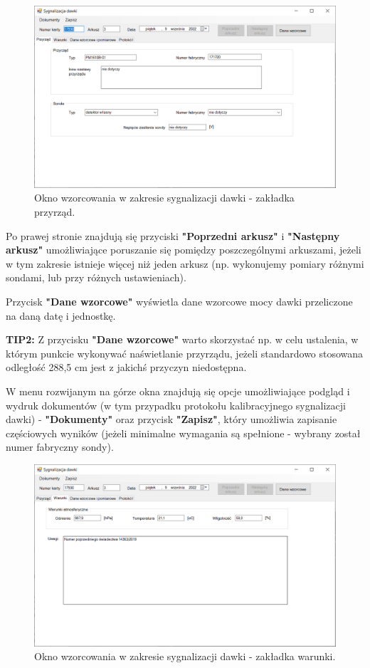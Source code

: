 	\begin{figure}[htb]
		\centering
		\includegraphics[width=\columnwidth]{obrazki/Wzorcowanie/syg_dawki/przyrzad.png}
		\caption{Okno wzorcowania w zakresie sygnalizacji dawki - zakładka przyrząd.}
		\label{sygDawkiPrzyrzad}
	\end{figure}
	
	Po prawej stronie znajdują się przyciski \textbf{"Poprzedni arkusz"} i \textbf{"Następny arkusz"} umożliwiające poruszanie się pomiędzy poszczególnymi arkuszami, jeżeli w tym zakresie istnieje więcej niż jeden arkusz (np. wykonujemy pomiary różnymi sondami, lub przy różnych ustawieniach).
	
	Przycisk \textbf{"Dane wzorcowe"} wyświetla dane wzorcowe mocy dawki przeliczone na daną datę i jednostkę.
	
	\textbf{TIP2:} Z przycisku \textbf{"Dane wzorcowe"} warto skorzystać np. w celu ustalenia, w którym punkcie wykonywać naświetlanie przyrządu, jeżeli standardowo stosowana odległość 288,5 cm jest z jakichś przyczyn niedostępna.
	
	W menu rozwijanym na górze okna znajdują się opcje umożliwiające podgląd i wydruk dokumentów (w tym przypadku protokołu kalibracyjnego sygnalizacji dawki) - \textbf{"Dokumenty"} oraz przycisk \textbf{"Zapisz"}, który umożliwia zapisanie częściowych wyników (jeżeli minimalne wymagania są spełnione - wybrany został numer fabryczny sondy).
	
	\begin{figure}[htb]
		\centering
		\includegraphics[width=\columnwidth]{obrazki/Wzorcowanie/syg_dawki/warunki.png}
		\caption{Okno wzorcowania w zakresie sygnalizacji dawki - zakładka warunki.}
		\label{sygDawkiWarunki}
	\end{figure}
	
